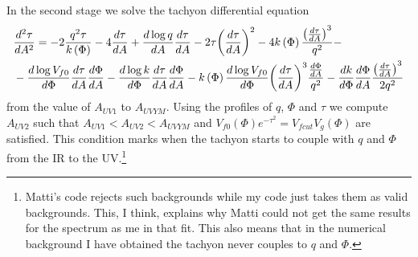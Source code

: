 \documentclass[10 pt]{article}
\begin{document}
In the second stage we solve the tachyon differential equation
\begin{align}
&\frac{d^2\tau}{d A^2} = - 2 \frac{q^2 \tau}{k\left(\Phi\right)} - 4 \frac{d \tau}{dA} + \frac{d \log q}{dA} \frac{d\tau}{dA} - 2 \tau {\left(\frac{d\tau}{dA}\right)}^2 - 4 k\left(\Phi\right) \frac{{\left( \frac{d\tau}{dA}\right)}^3}{q^2} - \\ \notag
& - \frac{d \log V_{f0}}{d\Phi} \frac{d\tau}{dA} \frac{d\Phi}{dA} - \frac{d \log k}{d\Phi} \frac{d\tau}{dA} \frac{d\Phi}{dA} - k\left(\Phi\right) \frac{d \log V_{f0}}{d\Phi} {\left(\frac{d\tau}{dA}\right)}^3 \frac{\frac{d\Phi}{dA}}{q^2} - \frac{d k}{d\Phi} \frac{d\Phi}{dA} \frac{{\left(\frac{d\tau}{dA}\right)}^3}{2 q^2}
\label{eq: tau YM 2}
\end{align}
from the value of $A_{UV1}$ to $A_{UVYM}$. Using the profiles of $q$, $\Phi$ and $\tau$ we compute $A_{UV2}$ such that $A_{UV1} < A_{UV2} < A_{UVYM}$ and $V_{f0}\left(\Phi\right) e^{-\tau^2} = V_{fcut} V_g \left(\Phi\right)$ are satisfied. This condition marks when the tachyon starts to couple with $q$ and $\Phi$ from the IR to the UV.\footnote{Matti's code rejects such backgrounds while my code just takes them as valid backgrounds. This, I think, explains why Matti could not get the same results for the spectrum as me in that fit. This also means that in the numerical background I have obtained the tachyon never couples to $q$ and $\Phi$. }
\end{document}

